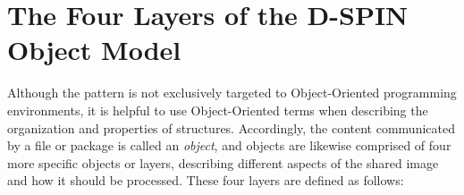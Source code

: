 \documentclass[11pt,letterpaper]{article}
\newcommand{\ATextCClr}[1]{\textcolor{atcColor}{\textbf{#1}}}
\newcommand{\DSPIN}{{\resizebox{!}{7.5pt}{\ATextCClr{D-SPIN}}}}
\newcommand{\p}[1]{

\vspace{1em}#1}
\newcommand{\llMOSAIC}{\mbox{{\LARGE MOSAIC}}}
\newcommand{\llWC}{\mbox{{\LARGE WhiteCharmDB}}}
\begin{document}
\setlength{\skip\footins}{18pt}	
	
{\linespread{1.25}\selectfont

\vspace*{1.5em}

\begin{center}






\begin{tcolorbox}
[
arc=2pt,outer arc=0pt,
enhanced jigsaw,
width=\textwidth,
colback=ctmppppy!40,
colframe=logoRed!30!darkRed,
drop shadow=logoPurple!50!darkRed,
]
\begin{minipage}{\textwidth}	
\begin{center}	
{\setlength{\fboxsep}{32pt}
	}
\end{center}
\end{minipage}
\end{tcolorbox}
\end{center}

\section{The Four Layers of the D-SPIN Object Model}

\p{Although the \DSPIN{} pattern is not 
exclusively targeted to Object-Oriented 
programming environments, it is helpful to 
use Object-Oriented terms when describing 
the organization and properties of \DSPIN{}  
structures.  Accordingly, the content 
communicated by a \DSPIN{} file or package 
is called an \textit{object}, and \DSPIN{} 
objects are likewise comprised of four 
more specific objects or layers, describing 
different aspects of the shared image and 
how it should be processed.  These 
four layers are defined as follows:

}}
\end{document}
